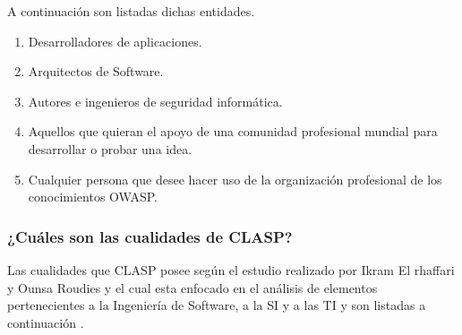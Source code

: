 \documentclass[runningheads,a4paper]{llncs}
\begin{document}
A continuación son listadas dichas entidades.

\begin{enumerate}
	\item Desarrolladores de aplicaciones.
	\item Arquitectos de \gls{Software}.
	\item Autores e ingenieros de seguridad informática.
	\item Aquellos que quieran el apoyo de una comunidad profesional mundial para desarrollar o probar una idea.
	\item Cualquier persona que desee hacer uso de la organización profesional de los conocimientos \gls{OWASP}.
\end{enumerate}
\subsubsection{¿Cuáles son las cualidades de \gls{CLASP}?}
Las cualidades que \gls{CLASP} posee según el estudio realizado por Ikram El rhaffari y Ounsa Roudies y el cual esta enfocado en el análisis de elementos pertenecientes a la Ingeniería de \gls{Software}, a la \gls{SI} y a las \gls{TI} y son listadas a continuación \cite{BenchmarkingSDLCLAPS}. 
\end{document}
